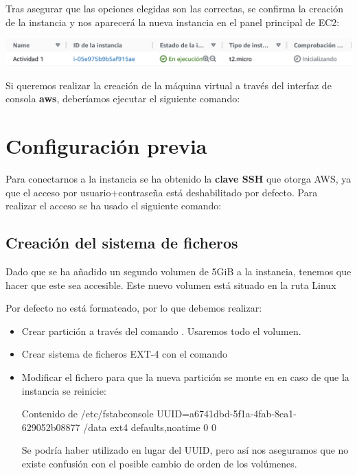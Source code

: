 \documentclass{\ClassPath/viu-tfm-template}
\begin{document}
Tras asegurar que las opciones elegidas son las correctas, se confirma la creación de la instancia y nos aparecerá la nueva instancia en el panel principal de EC2:

\includegraphics[frame,width=\linewidth]{img/estado.png}

Si queremos realizar la creación de la máquina virtual a través del interfaz de consola \textbf{aws}, deberíamos ejecutar el siguiente comando:



\section{Configuración previa}

Para conectarnos a la instancia se ha obtenido la \textbf{clave SSH} que otorga AWS, ya que el acceso por usuario+contraseña está deshabilitado por defecto. Para realizar el acceso se ha usado el siguiente comando:



\subsection{Creación del sistema de ficheros}
Dado que se ha añadido un segundo volumen de 5GiB a la instancia, tenemos que hacer que este sea accesible. Este nuevo volumen está situado en la ruta Linux 

Por defecto no está formateado, por lo que debemos realizar:
\begin{itemize}
    \item Crear partición a través del comando . Usaremos todo el volumen.
    \item Crear sistema de ficheros EXT-4 con el comando 
    \item Modificar el fichero  para que la nueva partición se monte en  en caso de que la instancia se reinicie:
    \begin{mycode}{Contenido de /etc/fstab}{console}{{\footnotesize }}
UUID=a6741dbd-5f1a-4fab-8ea1-629052b08877 /data ext4 defaults,noatime 0 0
\end{mycode}
    Se podría haber utilizado  en lugar del UUID, pero así nos aseguramos que no existe confusión con el posible cambio de orden de los volúmenes.
\end{itemize}
\end{document}
